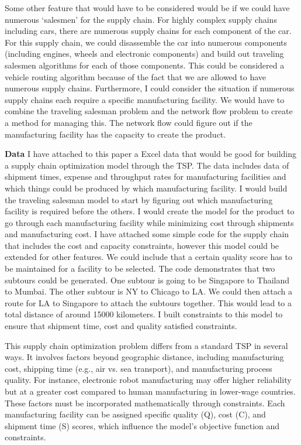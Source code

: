 Some other feature that would have to be considered would be if we could have numerous ‘salesmen’ for the supply chain. For highly complex supply chains including cars, there are numerous supply chains for each component of the car. For this supply chain, we could disassemble the car into numerous components (including engines, wheels and electronic components) and build out traveling salesmen algorithms for each of those components. This could be considered a vehicle routing algorithm because of the fact that we are allowed to have numerous supply chains. Furthermore, I could consider the situation if numerous supply chains each require a specific manufacturing facility. We would have to combine the traveling salesman problem and the network flow problem to create a method for managing this. The network flow could figure out if the manufacturing facility has the capacity to create the product. 

\textbf{Data}
I have attached to this paper a Excel data that would be good for building a supply chain optimization model through the TSP. The data includes data of shipment times, expense and throughput rates for manufacturing facilities and which things could be produced by which manufacturing facility. I would build the traveling salesman model to start by figuring out which manufacturing facility is required before the others. I would create the model for the product to go through each manufacturing facility while minimizing cost through shipments and manufacturing cost. I have attached some simple code for the supply chain that includes the cost and capacity constraints, however this model could be extended for other features. We could include that a certain quality score has to be maintained for a facility to be selected. 
The code demonstrates that two subtours could be generated. One subtour is going to be Singapore to Thailand to Mumbai. The other subtour is NY to Chicago to LA. We could then attach a route for LA to Singapore to attach the subtours together. This would lead to a total distance of around 15000 kilometers. I built constraints to this model to ensure that shipment time, cost and quality satisfied constraints.



This supply chain optimization problem differs from a standard TSP in several ways. It involves factors beyond geographic distance, including manufacturing cost, shipping time (e.g., air vs. sea transport), and manufacturing process quality. For instance, electronic robot manufacturing may offer higher reliability but at a greater cost compared to human manufacturing in lower-wage countries. These factors must be incorporated mathematically through constraints. Each manufacturing facility can be assigned specific quality (Q), cost (C), and shipment time (S) scores, which influence the model's objective function and constraints.

